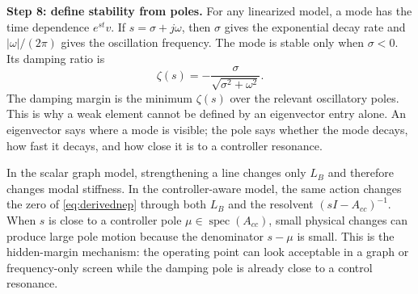 \documentclass[conference]{IEEEtran}
\newcommand{\spec}{\operatorname{spec}}
\begin{document}
\noindent\textbf{Step 8: define stability from poles.}
For any linearized model, a mode has the time dependence $e^{st}v$. If
$s=\sigma+j\omega$, then $\sigma$ gives the exponential decay rate and
$|\omega|/(2\pi)$ gives the oscillation frequency. The mode is stable only when
$\sigma<0$. Its damping ratio is
\begin{equation}
  \zeta(s)=-\frac{\sigma}{\sqrt{\sigma^2+\omega^2}}.
  \label{eq:pole_zeta_intro}
\end{equation}
The damping margin is the minimum $\zeta(s)$ over the relevant oscillatory
poles. This is why a weak element cannot be defined by an eigenvector entry
alone. An eigenvector says where a mode is visible; the pole says whether the
mode decays, how fast it decays, and how close it is to a controller resonance.

In the scalar graph model, strengthening a line changes only $L_B$ and therefore
changes modal stiffness. In the controller-aware model, the same action changes
the zero of \eqref{eq:derivednep} through both $L_B$ and the resolvent
$(sI-A_{cc})^{-1}$. When $s$ is close to a controller pole $\mu\in\spec(A_{cc})$,
small physical changes can produce large pole motion because the denominator
$s-\mu$ is small. This is the hidden-margin mechanism: the operating point can
look acceptable in a graph or frequency-only screen while the damping pole is
already close to a control resonance.
\end{document}
